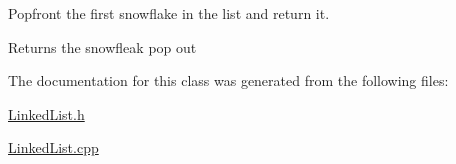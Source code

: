 Popfront the first snowflake in the list and return it. 

\begin{DoxyReturn}{Returns}
the snowfleak pop out 
\end{DoxyReturn}


The documentation for this class was generated from the following files\+:\begin{DoxyCompactItemize}
\item 
\hyperlink{_linked_list_8h}{Linked\+List.\+h}\item 
\hyperlink{_linked_list_8cpp}{Linked\+List.\+cpp}\end{DoxyCompactItemize}
